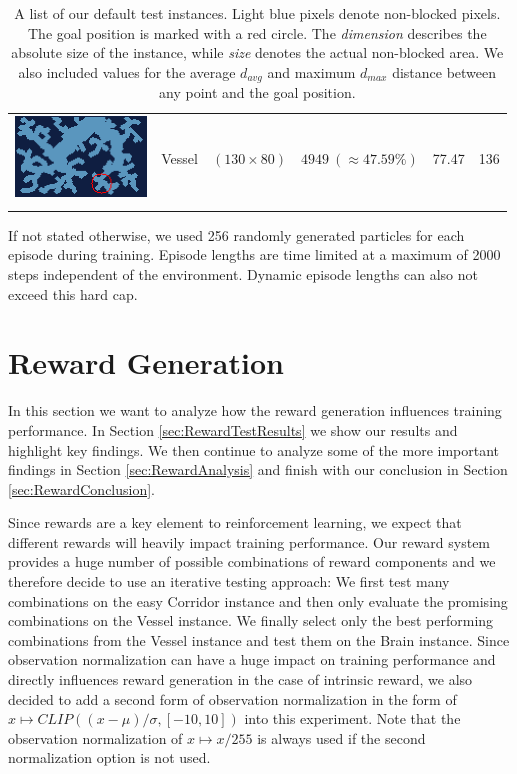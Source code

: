 \begin{table} [h!]
\begin{center}
\begin{tabular}{cccccc}
            \parbox[c]{3.5cm}{\includegraphics[clip, width=3.5cm]{figures/evaluation/procedure/vessel_upscaled.png}} & Vessel & $(130 \times 80)$ & $4949 \ (\approx 47.59\%)$ & 77.47 & 136 \\
            \addlinespace[0.05cm]
            \bottomrule
        \end{tabular}
    \end{center}
    \caption[Test Instances]{A list of our default test instances. Light blue pixels denote non-blocked pixels. The goal position is marked with a red circle. The \textit{dimension} describes the absolute size of the instance, while \textit{size} denotes the actual non-blocked area. We also included values for the average $d_{avg}$ and maximum $d_{max}$ distance between any point and the goal position.} \label{tab:TestInstances}
\end{table}

If not stated otherwise, we used 256 randomly generated particles for each episode during training. Episode lengths are time limited at a maximum of 2000 steps independent of the environment. Dynamic episode lengths can also not exceed this hard cap.

\section{Reward Generation} \label{sec:EvalReward}
In this section we want to analyze how the reward generation influences training performance. In Section \ref{sec:RewardTestResults} we show our results and highlight key findings. We then continue to analyze some of the more important findings in Section \ref{sec:RewardAnalysis} and finish with our conclusion in Section \ref{sec:RewardConclusion}.

Since rewards are a key element to reinforcement learning, we expect that different rewards will heavily impact training performance. Our reward system provides a huge number of possible combinations of reward components and we therefore decide to use an iterative testing approach: We first test many combinations on the easy Corridor instance and then only evaluate the promising combinations on the Vessel instance. We finally select only the best performing combinations from the Vessel instance and test them on the Brain instance. Since observation normalization can have a huge impact on training performance and directly influences reward generation in the case of intrinsic reward, we also decided to add a second form of observation normalization in the form of $x \mapsto CLIP((x - \mu)/\sigma, [-10, 10])$ into this experiment. Note that the observation normalization of $x \mapsto x/255$ is always used if the second normalization option is not used.

